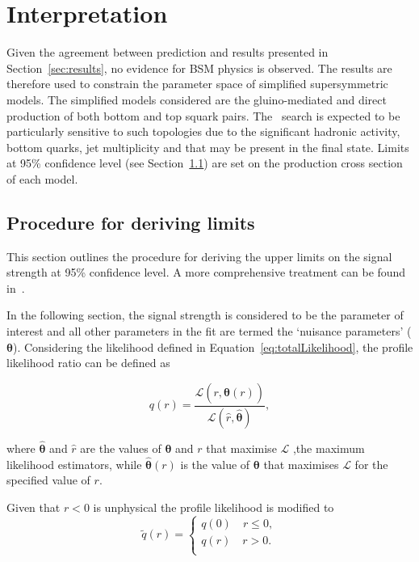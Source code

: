 \clearpage
\section{Interpretation}

Given the agreement between prediction and results presented in Section~\ref{sec:results}, no evidence
for BSM physics is observed. The results are therefore used to constrain
the parameter space of simplified supersymmetric models. The simplified 
models considered are the gluino-mediated and direct production of
both bottom and top squark pairs. The \alphat~search is expected to be particularly
sensitive to such topologies due to the significant hadronic activity, bottom quarks, jet multiplicity
and \mht that may be present in the final state. Limits at 95\% confidence level (see Section~\ref{sec:limits}) 
are set on the production cross section of each model.

\subsection{Procedure for deriving limits}
\label{sec:limits}

This section outlines the procedure for deriving the upper limits on the signal 
strength at 95\% confidence level. A more comprehensive treatment can be found in~\cite{asymp}.

In the following section, the signal strength is considered to be the parameter of interest
and all other parameters in the fit are termed the `nuisance parameters' ($\boldsymbol{\theta}$). Considering
the likelihood defined in Equation~\ref{eq:totalLikelihood}, the profile likelihood ratio can be defined as

\begin{equation}
\label{eq:profile}
q(r) = \frac{\mathcal{L}(r,\hat{\boldsymbol{\theta}}(r))}{\mathcal{L}(\hat{r},\hat{\boldsymbol{\theta}})},
\end{equation}

\noindent where $\hat{\boldsymbol{\theta}}$ and $\hat{r}$ are the values of $\boldsymbol{\theta}$ and $r$ that maximise $\mathcal{L}$
,the maximum likelihood estimators, while $\hat{\boldsymbol{\theta}}(r)$ is the value
of $\boldsymbol{\theta}$ that maximises $\mathcal{L}$ for the specified value of $r$. 

Given that $r < 0$ is unphysical the profile likelihood is modified to
\begin{equation}
\label{eq:profileNew}
\tilde{q}(r) = 
\begin{cases}
q(0)\quad r \le 0, \\ 
q(r)\quad r > 0. \\ 
\end{cases}
\end{equation}

